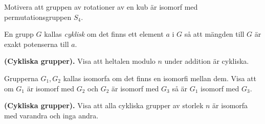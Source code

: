 \documentclass[11pt,fleqn]{book} %
\begin{document}
\begin{problem}
  Motivera att gruppen av rotationer av en kub är isomorf med permutationsgruppen \(S_4\). 
\end{problem}



%   



\begin{definition}
  En grupp \(G\) kallas \textit{cyklisk} om det finns ett element \(a\) i \(G\) så att mängden till \(G\) är exakt potenserna till \(a\). 
\end{definition}

\begin{problem}\textbf{(Cykliska grupper).} Visa att heltalen modulo \(n\) under addition är cykliska.
\end{problem}

\begin{problem}
  Grupperna \(G_1, G_2\) kallas isomorfa om det finns en isomorfi mellan dem. Visa att om \(G_1\) är isomorf med \(G_2\) och \(G_2\) är isomorf med \(G_3\) så är \(G_1\) isomorf med \(G_3\).
\end{problem}

\begin{problem}\textbf{(Cykliska grupper).} Visa att alla cykliska grupper av storlek \(n\) är isomorfa med varandra och inga andra.
\end{problem}
\end{document}
